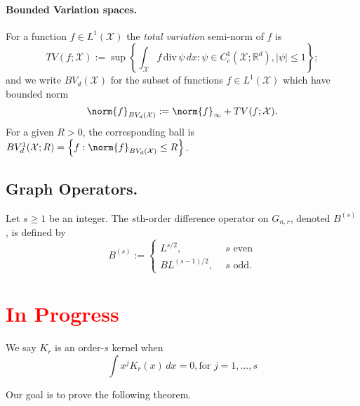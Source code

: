 \documentclass{article}
\newcommand{\Reals}{\mathbb{R}}
\newcommand{\abs}[1]{\left \lvert #1 \right \rvert}
\newcommand{\set}[1]{\left\{#1\right\}}
\newcommand{\1}{\mathbf{1}}
\newcommand{\Xsetive}{\mathrm{div}}
\theoremstyle{alden}
\theoremstyle{aldenthm}
\theoremstyle{definition}
\theoremstyle{remark}
\begin{document}
\paragraph{Bounded Variation spaces.}

For a function $f \in L^1(\mathcal{X})$ the \emph{total variation} semi-norm of $f$ is
\begin{equation*}
TV(f;\mathcal{X}) := \sup \left\{ \int_{\mathcal{X}} f \, \Xsetive \, \psi \,dx : \psi \in C_c^1(\mathcal{X}; \Reals^d), \abs{\psi} \leq 1 \right\};
\end{equation*}
and we write $BV_d(\mathcal{X})$ for the subset of functions $f \in L^1(\mathcal{X})$ which have bounded norm
\begin{equation*}
\norm{f}_{BV_d(\mathcal{X})} := \norm{f}_{\infty} + TV(f;\mathcal{X}).
\end{equation*}
For a given $R > 0$, the corresponding ball is $BV_d^{1}(\mathcal{X};R) = \set{f: \norm{f}_{BV_d(\mathcal{X})} \leq R}$. 

\subsection{Graph Operators.}
Let $s \geq 1$ be an integer. The $s$th-order difference operator on $G_{n,r}$, denoted $B^{(s)}$, is defined by
\begin{equation*}
B^{(s)} :=
\begin{cases}
L^{s/2},& ~~ s \textrm{ even} \\
BL^{(s - 1)/2},& ~~ s \textrm{ odd.}
\end{cases}
\end{equation*}

\section{\textcolor{red}{In Progress}}

We say $K_{r}$ is an order-$s$ kernel when 
\begin{equation*}
\int x^j K_{r}(x) \,dx = 0, \textrm{for $j = 1,\dots,s$}
\end{equation*}

Our goal is to prove the following theorem.
\end{document}
